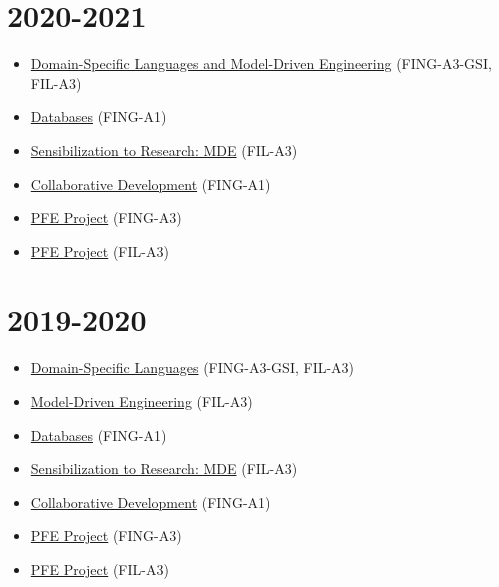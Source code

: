 \hypertarget{section-2}{%
\section{2020-2021}\label{section-2}}

\begin{itemize}
\tightlist
\item
  \href{https://moodle.imt-atlantique.fr/course/view.php?id=313}{Domain-Specific
  Languages and Model-Driven Engineering} (FING-A3-GSI, FIL-A3)
\item
  \href{https://formations.imt-atlantique.fr/bd_ihm}{Databases}
  (FING-A1)
\item
  \href{https://moodle.imt-atlantique.fr/course/view.php?id=299}{Sensibilization
  to Research: MDE} (FIL-A3)
\item
  \href{https://moodle.imt-atlantique.fr/course/view.php?id=16}{Collaborative
  Development} (FING-A1)
\item
  \href{https://moodle.imt-atlantique.fr/course/view.php?id=314}{PFE
  Project} (FING-A3)
\item
  \href{https://moodle.imt-atlantique.fr/course/view.php?id=314}{PFE
  Project} (FIL-A3)
\end{itemize}

\hypertarget{section-3}{%
\section{2019-2020}\label{section-3}}

\begin{itemize}
\tightlist
\item
  \href{https://moodle.imt-atlantique.fr/course/view.php?id=313}{Domain-Specific
  Languages} (FING-A3-GSI, FIL-A3)
\item
  \href{https://moodle.imt-atlantique.fr/course/view.php?id=668}{Model-Driven
  Engineering} (FIL-A3)
\item
  \href{https://formations.imt-atlantique.fr/bd_ihm}{Databases}
  (FING-A1)
\item
  \href{https://moodle.imt-atlantique.fr/course/view.php?id=299}{Sensibilization
  to Research: MDE} (FIL-A3)
\item
  \href{https://moodle.imt-atlantique.fr/course/view.php?id=16}{Collaborative
  Development} (FING-A1)
\item
  \href{https://moodle.imt-atlantique.fr/course/view.php?id=314}{PFE
  Project} (FING-A3)
\item
  \href{https://moodle.imt-atlantique.fr/course/view.php?id=314}{PFE
  Project} (FIL-A3)
\end{itemize}

